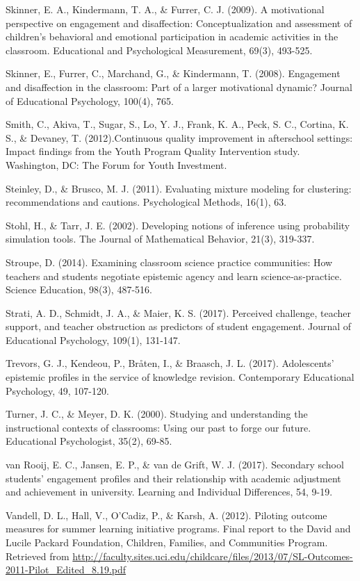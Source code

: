 \documentclass[]{msu-thesis}
\theoremstyle{definition}
\theoremstyle{definition}
\theoremstyle{definition}
\theoremstyle{remark}
\begin{document}
Skinner, E. A., Kindermann, T. A., \& Furrer, C. J. (2009). A
motivational perspective on engagement and disaffection:
Conceptualization and assessment of children's behavioral and emotional
participation in academic activities in the classroom. Educational and
Psychological Measurement, 69(3), 493-525.

Skinner, E., Furrer, C., Marchand, G., \& Kindermann, T. (2008).
Engagement and disaffection in the classroom: Part of a larger
motivational dynamic? Journal of Educational Psychology, 100(4), 765.

Smith, C., Akiva, T., Sugar, S., Lo, Y. J., Frank, K. A., Peck, S. C.,
Cortina, K. S., \& Devaney, T. (2012).Continuous quality improvement in
afterschool settings: Impact findings from the Youth Program Quality
Intervention study. Washington, DC: The Forum for Youth Investment.

Steinley, D., \& Brusco, M. J. (2011). Evaluating mixture modeling for
clustering: recommendations and cautions. Psychological Methods, 16(1),
63.

Stohl, H., \& Tarr, J. E. (2002). Developing notions of inference using
probability simulation tools. The Journal of Mathematical Behavior,
21(3), 319-337.

Stroupe, D. (2014). Examining classroom science practice communities:
How teachers and students negotiate epistemic agency and learn
science‐as‐practice. Science Education, 98(3), 487-516.

Strati, A. D., Schmidt, J. A., \& Maier, K. S. (2017). Perceived
challenge, teacher support, and teacher obstruction as predictors of
student engagement. Journal of Educational Psychology, 109(1), 131-147.

Trevors, G. J., Kendeou, P., Bråten, I., \& Braasch, J. L. (2017).
Adolescents' epistemic profiles in the service of knowledge revision.
Contemporary Educational Psychology, 49, 107-120.

Turner, J. C., \& Meyer, D. K. (2000). Studying and understanding the
instructional contexts of classrooms: Using our past to forge our
future. Educational Psychologist, 35(2), 69-85.

van Rooij, E. C., Jansen, E. P., \& van de Grift, W. J. (2017).
Secondary school students' engagement profiles and their relationship
with academic adjustment and achievement in university. Learning and
Individual Differences, 54, 9-19.

Vandell, D. L., Hall, V., O'Cadiz, P., \& Karsh, A. (2012). Piloting
outcome measures for summer learning initiative programs. Final report
to the David and Lucile Packard Foundation, Children, Families, and
Communities Program. Retrieved from
\url{http://faculty.sites.uci.edu/childcare/files/2013/07/SL-Outcomes-2011-Pilot_Edited_8.19.pdf}
\end{document}
